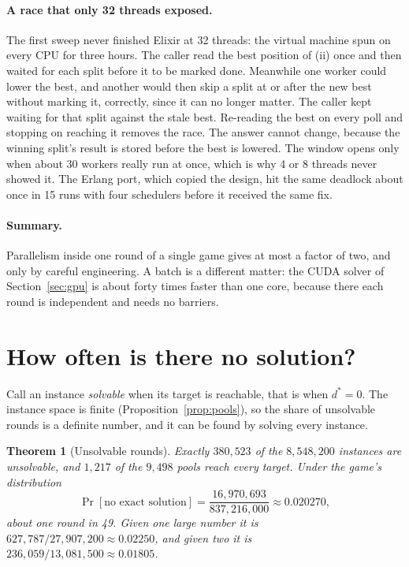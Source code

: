 \documentclass[11pt,a4paper]{article}
\newtheorem{theorem}{Theorem}[section]
\theoremstyle{definition}
\theoremstyle{remark}
\begin{document}
\paragraph{A race that only 32 threads exposed.}
The first sweep never finished Elixir at 32 threads: the virtual machine spun on every CPU for three hours.
The caller read the best position of (ii) once and then waited for each split before it to be marked done.
Meanwhile one worker could lower the best, and another would then skip a split at or after the new
best without marking it, correctly, since it can no longer matter. The caller kept waiting for that split
against the stale best. Re-reading the best on every poll and stopping on reaching it removes the race.
The answer cannot change, because the winning split's result is stored before the best is lowered. The
window opens only when about 30 workers really run at once, which is why 4 or 8 threads never showed it.
The Erlang port, which copied the design, hit the same deadlock about once in 15 runs with four schedulers
before it received the same fix.

\paragraph{Summary.}
Parallelism inside one round of a single game gives at most a factor of two, and only by careful
engineering. A batch is a different matter: the CUDA solver of Section~\ref{sec:gpu} is about forty times
faster than one core, because there each round is independent and needs no barriers.

\section{How often is there no solution?}\label{sec:solvability}

Call an instance \emph{solvable} when its target is reachable, that is when $d^* = 0$. The instance space
is finite (Proposition~\ref{prop:pools}), so the share of unsolvable rounds is a definite number, and it
can be found by solving every instance.

\begin{theorem}[Unsolvable rounds]\label{thm:unsolvable}
Exactly $380{,}523$ of the $8{,}548{,}200$ instances are unsolvable, and $1{,}217$ of the $9{,}498$ pools
reach every target. Under the game's distribution
\[
  \Pr[\text{no exact solution}] = \frac{16{,}970{,}693}{837{,}216{,}000} \approx 0.020270,
\]
about one round in 49. Given one large number it is $627{,}787 / 27{,}907{,}200 \approx 0.02250$, and given two
it is $236{,}059 / 13{,}081{,}500 \approx 0.01805$.
\end{theorem}
\end{document}
